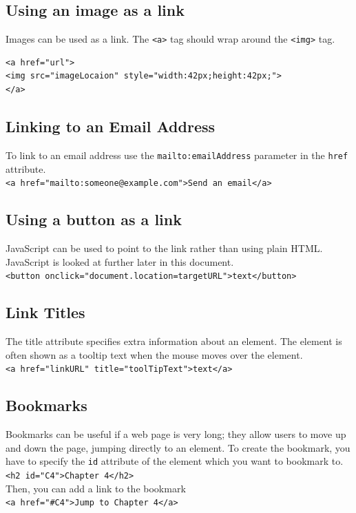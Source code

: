 \documentclass{thomasClass}
\begin{document}
\subsection{Using an image as a link}
Images can be used as a link. The \verb|<a>| tag should wrap around the \verb|<img>| tag.
\begin{verbatim}
<a href="url">
<img src="imageLocaion" style="width:42px;height:42px;">
</a>
\end{verbatim}
\subsection{Linking to an Email Address}
To link to an email address use the \verb|mailto:emailAddress| parameter in the \verb|href| attribute.\\
\verb|<a href="mailto:someone@example.com">Send an email</a>|
\subsection{Using a button as a link}
JavaScript can be used to point to the link rather than using plain HTML. JavaScript is looked at further later in this document.\\
\verb|<button onclick="document.location=targetURL">text</button>|
\subsection{Link Titles}
The title attribute specifies extra information about an element. The element is often shown as a tooltip text when the mouse moves over the element.\\
\verb|<a href="linkURL" title="toolTipText">text</a>|
\subsection{Bookmarks}
Bookmarks can be useful if a web page is very long; they allow users to move up and down the page, jumping directly to an element. To create the bookmark, you have to specify the \verb|id| attribute of the element which you want to bookmark to.\\
\verb|<h2 id="C4">Chapter 4</h2>|\\
Then, you can add a link to the bookmark\\
\verb|<a href="#C4">Jump to Chapter 4</a>|
\end{document}
